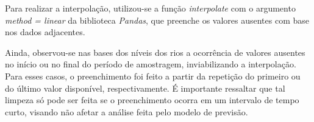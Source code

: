 Para realizar a interpolação, utilizou-se a função \textit{interpolate} com o argumento \textit{method = linear} da biblioteca \textit{Pandas}, que preenche os valores ausentes com base nos dados adjacentes.

Ainda, observou-se nas bases dos níveis dos rios a ocorrência de valores ausentes no início ou no final do período de amostragem, inviabilizando a interpolação. Para esses casos, o preenchimento foi feito a partir da repetição do primeiro ou do último valor disponível, respectivamente. É importante ressaltar que tal limpeza só pode ser feita se o preenchimento ocorra em um intervalo de tempo curto, visando não afetar a análise feita pelo modelo de previsão.